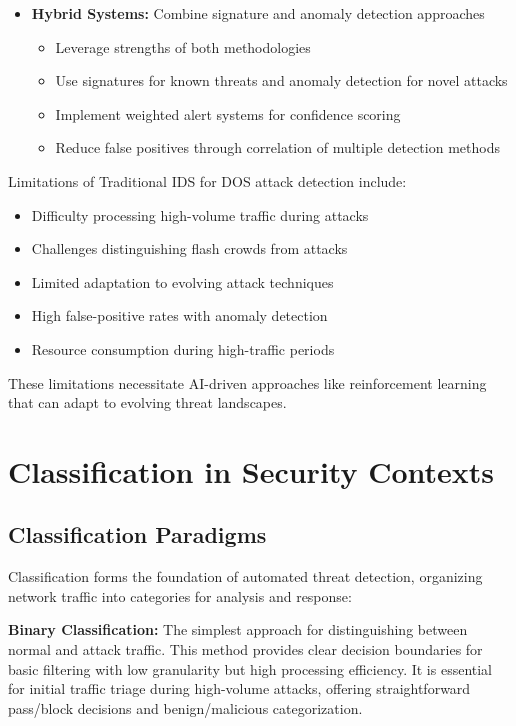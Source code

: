 \documentclass{report}
\begin{document}
\begin{itemize}
\begin{itemize}
  \item \textbf{Hybrid Systems:} Combine signature and anomaly detection approaches
    \begin{itemize}
    \item Leverage strengths of both methodologies
    \item Use signatures for known threats and anomaly detection for novel attacks
    \item Implement weighted alert systems for confidence scoring
    \item Reduce false positives through correlation of multiple detection methods
    \end{itemize}
  \end{itemize}
\end{itemize}

Limitations of Traditional IDS for DOS attack detection include:
\begin{itemize}
\item Difficulty processing high-volume traffic during attacks
\item Challenges distinguishing flash crowds from attacks
\item Limited adaptation to evolving attack techniques
\item High false-positive rates with anomaly detection
\item Resource consumption during high-traffic periods
\end{itemize}

These limitations necessitate AI-driven approaches like reinforcement learning that can adapt to evolving threat landscapes.

\section{Classification in Security Contexts}

\subsection{Classification Paradigms}

Classification forms the foundation of automated threat detection, organizing network traffic into categories for analysis and response:

\textbf{Binary Classification:} The simplest approach for distinguishing between normal and attack traffic. This method provides clear decision boundaries for basic filtering with low granularity but high processing efficiency. It is essential for initial traffic triage during high-volume attacks, offering straightforward pass/block decisions and benign/malicious categorization.
\end{document}
